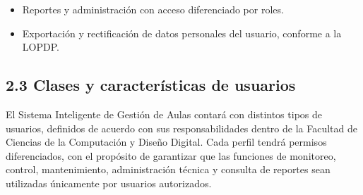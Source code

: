 \begin{itemize}\item Reportes y administración con acceso diferenciado por roles.\end{itemize}

\begin{itemize}\item Exportación y rectificación de datos personales del usuario, conforme a la LOPDP.\end{itemize}

\subsection*{2.3 Clases y características de usuarios}


El Sistema Inteligente de Gestión de Aulas contará con distintos tipos de usuarios, definidos de acuerdo con sus responsabilidades dentro de la Facultad de Ciencias de la Computación y Diseño Digital. Cada perfil tendrá permisos diferenciados, con el propósito de garantizar que las funciones de monitoreo, control, mantenimiento, administración técnica y consulta de reportes sean utilizadas únicamente por usuarios autorizados.


